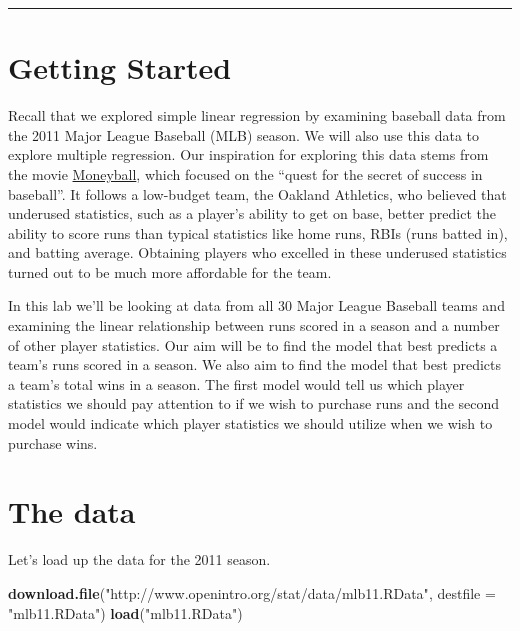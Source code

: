 \documentclass[]{book}
\newenvironment{Shaded}{\begin{snugshade}}{\end{snugshade}}
\newcommand{\KeywordTok}[1]{\textcolor[rgb]{0.13,0.29,0.53}{\textbf{{#1}}}}
\newcommand{\DataTypeTok}[1]{\textcolor[rgb]{0.13,0.29,0.53}{{#1}}}
\newcommand{\StringTok}[1]{\textcolor[rgb]{0.31,0.60,0.02}{{#1}}}
\newcommand{\NormalTok}[1]{{#1}}
\theoremstyle{definition}
\theoremstyle{definition}
\theoremstyle{definition}
\theoremstyle{remark}
\begin{document}
\begin{center}\rule{0.5\linewidth}{\linethickness}\end{center}

\section{Getting Started}\label{getting-started-4}

Recall that we explored simple linear regression by examining baseball
data from the 2011 Major League Baseball (MLB) season. We will also use
this data to explore multiple regression. Our inspiration for exploring
this data stems from the movie
\href{http://en.wikipedia.org/wiki/Moneyball_(film)}{Moneyball}, which
focused on the ``quest for the secret of success in baseball''. It
follows a low-budget team, the Oakland Athletics, who believed that
underused statistics, such as a player's ability to get on base, better
predict the ability to score runs than typical statistics like home
runs, RBIs (runs batted in), and batting average. Obtaining players who
excelled in these underused statistics turned out to be much more
affordable for the team.

In this lab we'll be looking at data from all 30 Major League Baseball
teams and examining the linear relationship between runs scored in a
season and a number of other player statistics. Our aim will be to find
the model that best predicts a team's runs scored in a season. We also
aim to find the model that best predicts a team's total wins in a
season. The first model would tell us which player statistics we should
pay attention to if we wish to purchase runs and the second model would
indicate which player statistics we should utilize when we wish to
purchase wins.

\section{The data}\label{the-data-5}

Let's load up the data for the 2011 season.

\begin{Shaded}
\begin{Highlighting}[]
\KeywordTok{download.file}\NormalTok{(}\StringTok{"http://www.openintro.org/stat/data/mlb11.RData"}\NormalTok{, }\DataTypeTok{destfile =} \StringTok{"mlb11.RData"}\NormalTok{)}
\KeywordTok{load}\NormalTok{(}\StringTok{"mlb11.RData"}\NormalTok{)}
\end{Highlighting}
\end{Shaded}
\end{document}
